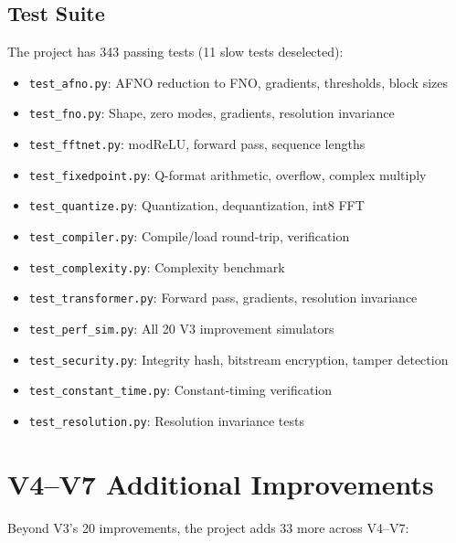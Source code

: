 \documentclass[11pt,a4paper]{article}
\theoremstyle{definition}
\theoremstyle{remark}
\begin{document}
\subsection{Test Suite}

The project has 343 passing tests (11 slow tests deselected):
\begin{itemize}[noitemsep]
  \item \texttt{test\_afno.py}: AFNO reduction to FNO, gradients, thresholds, block sizes
  \item \texttt{test\_fno.py}: Shape, zero modes, gradients, resolution invariance
  \item \texttt{test\_fftnet.py}: modReLU, forward pass, sequence lengths
  \item \texttt{test\_fixedpoint.py}: Q-format arithmetic, overflow, complex multiply
  \item \texttt{test\_quantize.py}: Quantization, dequantization, int8 FFT
  \item \texttt{test\_compiler.py}: Compile/load round-trip, verification
  \item \texttt{test\_complexity.py}: Complexity benchmark
  \item \texttt{test\_transformer.py}: Forward pass, gradients, resolution invariance
  \item \texttt{test\_perf\_sim.py}: All 20 V3 improvement simulators
  \item \texttt{test\_security.py}: Integrity hash, bitstream encryption, tamper detection
  \item \texttt{test\_constant\_time.py}: Constant-timing verification
  \item \texttt{test\_resolution.py}: Resolution invariance tests
\end{itemize}

\section{V4--V7 Additional Improvements}

Beyond V3's 20 improvements, the project adds 33 more across V4--V7:
\end{document}
